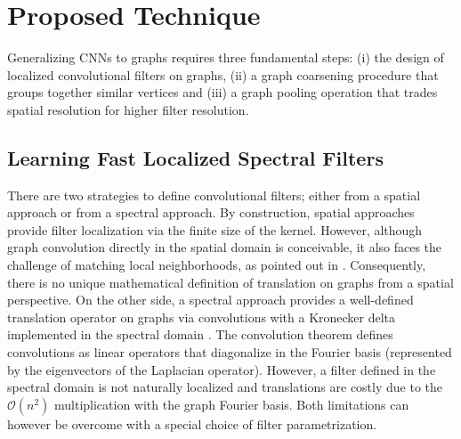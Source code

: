 \documentclass{article}
\newcommand{\bO}{\mathcal{O}}
\begin{document}
\section{Proposed Technique}

Generalizing CNNs to graphs requires three fundamental steps: (i) the design of
localized convolutional filters on graphs, (ii) a graph coarsening procedure
that groups together similar vertices and (iii) a graph pooling operation that
trades spatial resolution for higher filter resolution. 

\subsection{Learning Fast Localized Spectral Filters} \label{sec:filters}

There are two strategies to define convolutional filters; either from a spatial
approach or from a spectral approach. By construction, spatial approaches
provide filter localization via the finite size of the kernel. However,
although graph convolution directly in the spatial domain is conceivable, it
also faces the challenge of matching local neighborhoods, as pointed out in
\cite{art:BrunaZarembaSzlamLeCun13DLgraphs}. Consequently, there is no unique
mathematical definition of translation on graphs from a spatial perspective. On
the other side, a spectral approach provides a well-defined translation
operator on graphs via convolutions with a Kronecker delta implemented in the
spectral domain \cite{art:ShumanNarangFrossardOrtegaVandergheynst13ReviewSPG}.
The convolution theorem \cite{book:Mallat99wavelets} defines convolutions as
linear operators that diagonalize in the Fourier basis (represented by the
eigenvectors of the Laplacian operator). However, a filter defined in the
spectral domain is not naturally localized and translations are costly due to
the $\bO(n^2)$ multiplication with the graph Fourier basis. Both limitations
can however be overcome with a special choice of filter parametrization.

\end{document}
